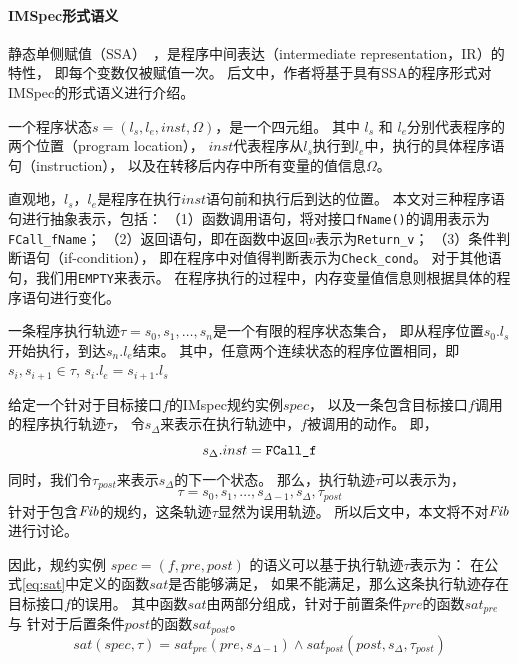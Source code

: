 \paragraph{IMSpec形式语义}
静态单侧赋值（SSA）~\cite{ssa}，是程序中间表达（intermediate representation，IR）的特性，
即每个变数仅被赋值一次。
后文中，作者将基于具有SSA的程序形式对IMSpec的形式语义进行介绍。

\begin{definition}[程序状态]
	一个程序状态$s = (l_s, l_e, inst, \Omega)$，是一个四元组。
	其中 $l_s$ 和 $l_e$分别代表程序的两个位置（program location）， 
	$inst$代表程序从$l_s$执行到$l_e$中，执行的具体程序语句（instruction），
	以及在转移后内存中所有变量的值信息$\Omega$。
\end{definition}

直观地，$l_s，l_e$是程序在执行$inst$语句前和执行后到达的位置。
本文对三种程序语句进行抽象表示，包括：
（1）函数调用语句，将对接口\texttt{fName()}的调用表示为\texttt{FCall\_fName}；
（2）返回语句，即在函数中返回$v$表示为\texttt{Return\_v}；
（3）条件判断语句（if-condition），
即在程序中对值得判断表示为\texttt{Check\_cond}。
对于其他语句，我们用\texttt{EMPTY}来表示。
在程序执行的过程中，内存变量值信息则根据具体的程序语句进行变化。

\begin{definition}[执行轨迹]
	一条程序执行轨迹$\tau = s_0, s_1, \dots, s_n$是一个有限的程序状态集合，
	即从程序位置$s_0.l_s$开始执行，到达$s_n.l_e$结束。
	其中，任意两个连续状态的程序位置相同，即$s_i, s_{i+1} \in \tau$, $s_i.l_e = s_{i+1}.l_s$
\end{definition}

给定一个针对于目标接口$f$的IMspec规约实例$\mathit{spec}$，
以及一条包含目标接口$f$调用的程序执行轨迹$\tau$，
令$s_{\Delta}$来表示在执行轨迹中，$f$被调用的动作。
即，$$s_{\Delta}.inst = \text{\texttt{FCall\_f}}$$
同时，我们令$\tau_{post}$来表示$s_{\Delta}$的下一个状态。
那么，执行轨迹$\tau$可以表示为，
$$\tau = s_0, s_1, \dots, s_{\Delta-1}, s_{\Delta}, \tau_{post}$$
针对于包含$\mathit{Fib}$的规约，这条轨迹$\tau$显然为误用轨迹。
所以后文中，本文将不对$\mathit{Fib}$进行讨论。

因此，规约实例
$\mathit{spec} = (f, \mathit{pre}, \mathit{post})$
的语义可以基于执行轨迹$\tau$表示为：
在公式\ref{eq:sat}中定义的函数$sat$是否能够满足，
如果不能满足，那么这条执行轨迹存在目标接口$f$的误用。
其中函数$sat$由两部分组成，针对于前置条件$\mathit{pre}$的函数$sat_{pre}$与
针对于后置条件$\mathit{post}$的函数$sat_{post}$。
\begin{equation}
\label{eq:sat}
sat(\textit{spec}, \tau) = 
sat_{pre}(\mathit{pre},
s_{\Delta-1}) \wedge sat_{post}(\mathit{post},s_{\Delta},\tau_{post})
\end{equation}

